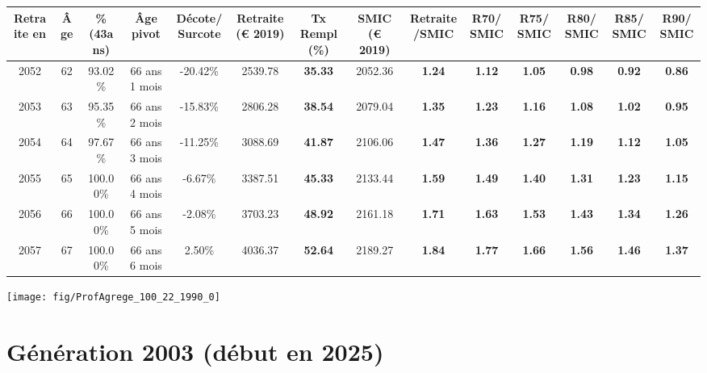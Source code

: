 \begin{adjustbox}{max width=\textwidth} 
\begin{tabular}[htb]{|c|c||c|c|c||c|c||c|c||c|c|c|c|c|} 
\hline 
 Retraite en &  Âge &  \%(43ans) &  Âge pivot &  Décote/Surcote &  Retraite (\euro{} 2019) &  Tx Rempl(\%) &  SMIC (\euro{} 2019) &  Retraite/SMIC &  R70/SMIC &  R75/SMIC &  R80/SMIC &  R85/SMIC &  R90/SMIC \\ 
\hline \hline 
 2052 &  62 &  93.02\% &  66 ans 1 mois &  -20.42\% &  2539.78 &  {\bf 35.33} &  2052.36 &  {\bf 1.24} &  {\bf 1.12} &  {\bf 1.05} &  {\bf {\color{red} 0.98}} &  {\bf {\color{red} 0.92}} &  {\bf {\color{red} 0.86}} \\ 
\hline 
 2053 &  63 &  95.35\% &  66 ans 2 mois &  -15.83\% &  2806.28 &  {\bf 38.54} &  2079.04 &  {\bf 1.35} &  {\bf 1.23} &  {\bf 1.16} &  {\bf 1.08} &  {\bf 1.02} &  {\bf {\color{red} 0.95}} \\ 
\hline 
 2054 &  64 &  97.67\% &  66 ans 3 mois &  -11.25\% &  3088.69 &  {\bf 41.87} &  2106.06 &  {\bf 1.47} &  {\bf 1.36} &  {\bf 1.27} &  {\bf 1.19} &  {\bf 1.12} &  {\bf 1.05} \\ 
\hline 
 2055 &  65 &  100.00\% &  66 ans 4 mois &  -6.67\% &  3387.51 &  {\bf 45.33} &  2133.44 &  {\bf 1.59} &  {\bf 1.49} &  {\bf 1.40} &  {\bf 1.31} &  {\bf 1.23} &  {\bf 1.15} \\ 
\hline 
 2056 &  66 &  100.00\% &  66 ans 5 mois &  -2.08\% &  3703.23 &  {\bf 48.92} &  2161.18 &  {\bf 1.71} &  {\bf 1.63} &  {\bf 1.53} &  {\bf 1.43} &  {\bf 1.34} &  {\bf 1.26} \\ 
\hline 
 2057 &  67 &  100.00\% &  66 ans 6 mois &  2.50\% &  4036.37 &  {\bf 52.64} &  2189.27 &  {\bf 1.84} &  {\bf 1.77} &  {\bf 1.66} &  {\bf 1.56} &  {\bf 1.46} &  {\bf 1.37} \\ 
\hline 
\hline 
\end{tabular} 
\end{adjustbox} 
 
 \vspace{0.1cm} 

 {\hspace{-2.2cm}\texttt{[image: fig/ProfAgrege\_100\_22\_1990\_0]}} 

\newpage 
 
\section{Génération 2003 (début en 2025)\label{ProfAgrege_100_22_2003_0}} 
 
